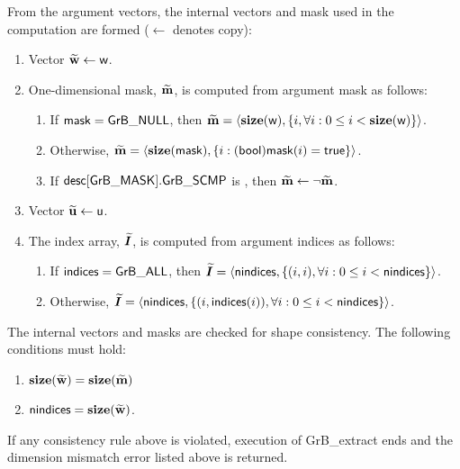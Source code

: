 From the argument vectors, the internal vectors and mask used in 
the computation are formed ($\leftarrow$ denotes copy):
\begin{enumerate}
	\item Vector ${\bf \widetilde{w}} \leftarrow {\sf w}$.

	\item One-dimensional mask, ${\bf \widetilde{m}}$, is computed from 
    argument {\sf mask} as follows:
	\begin{enumerate}
		\item	If ${\sf mask} = {\sf GrB\_NULL}$, then ${\bf \widetilde{m}} = 
        \langle \bold{size}({\sf w}), \{i, \forall i : 0 \leq i < 
        \bold{size}({\sf w}) \} \rangle$.

		\item	Otherwise, ${\bf \widetilde{m}} = 
        \langle \bold{size}({\sf mask}), \{i : ({\sf bool}){\sf mask}(i) = 
        {\sf true}\} \rangle$.

		\item	If ${\sf desc[GrB\_MASK].GrB\_SCMP}$ is \true, then ${\bf \widetilde{m}} \leftarrow \neg {\bf \widetilde{m}}$.
	\end{enumerate}

	\item Vector ${\bf \widetilde{u}} \leftarrow {\sf u}$.
    
    \item The index array, $\bm{\widetilde{I}}$, is computed from 
    argument {\sf indices} as follows:
	\begin{enumerate}
		\item	If ${\sf indices} = {\sf GrB\_ALL}$, then $\bm{\widetilde{I}} = 
        \langle {\sf nindices}, \{(i, i), \forall i : 0 \leq i < 
        {\sf nindices} \} \rangle$.

		\item	Otherwise, $\bm{\widetilde{I}} = 
        \langle {\sf nindices}, \{(i, {\sf indices}(i)), \forall i : 0 \leq i < 
        {\sf nindices} \} \rangle$.
    \end{enumerate}
\end{enumerate}

The internal vectors and masks are checked for shape consistency. The following 
conditions must hold:
\begin{enumerate}
	\item $\bold{size}({\bf \widetilde{w}}) = \bold{size}({\bf \widetilde{m}})$
    \item ${\sf nindices} = \bold{size}({\bf \widetilde{w}})$.
\end{enumerate}
If any consistency rule above is violated, execution of {\sf GrB\_extract} ends and 
the dimension mismatch error listed above is returned.

